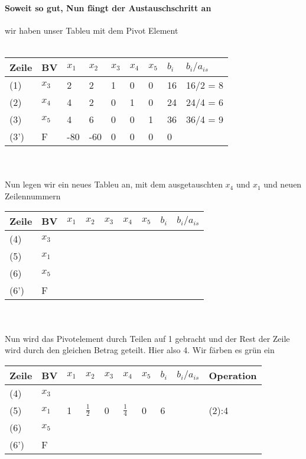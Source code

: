 \documentclass{article}
\begin{document}
\paragraph{Soweit so gut, Nun fängt der Austauschschritt an}
wir haben unser Tableu mit dem Pivot Element\\\\
\begin{tabular}{|l|l|l|l|l|l|l|l|l|}
	\hline
	Zeile & BV & $x_{1}$&$x_{2}$&$x_{3}$&$x_{4}$&$x_{5}$&$b_{i}$&$b_{i}/a_{is}$\\
	\hline
	(1)&$x_{3}$&2&2&1&0&0&16&16/2 = 8\\
	\hline
	(2)&$x_{4}$&\cellcolor{green}4&2&0&1&0&24&24/4 = 6\\
	\hline
	(3)&$x_{5}$&4&6&0&0&1&36&36/4 = 9\\
	\hline
	(3')&F&-80&-60&0&0&0&0&\\
	\hline
\end{tabular}\\\\
Nun legen wir ein neues Tableu an, mit dem ausgetauschten $x_{4}$ und $x_{1}$ und neuen Zeilennummern\\
\begin{tabular}{|l|l|l|l|l|l|l|l|l|}
	\hline
	Zeile & BV &\cellcolor{blue} $x_{1}$&$x_{2}$&$x_{3}$&$x_{4}$&$x_{5}$&$b_{i}$&$b_{i}/a_{is}$\\
	\hline
	(4)&$x_{3}$&&&&&&&\\
	\hline
	(5)&\cellcolor{blue}$x_{1}$&&&&&&&\\
	\hline
	(6)&$x_{5}$&&&&&&&\\
	\hline
	(6')&F&&&&&&&\\
	\hline
\end{tabular}\\\\
Nun wird das Pivotelement durch Teilen auf 1 gebracht und der Rest der Zeile wird durch den gleichen Betrag geteilt. Hier also 4. Wir färben es grün ein\\ 
\begin{tabular}{|l|l|l|l|l|l|l|l|l|l|}
	\hline
	Zeile & BV &$x_{1}$&$x_{2}$&$x_{3}$&$x_{4}$&$x_{5}$&$b_{i}$&$b_{i}/a_{is}$&Operation\\
	\hline
	(4)&$x_{3}$&&&&&&&&\\
	\hline
	(5)&$x_{1}$&\cellcolor{green}1&\cellcolor{green}$\frac{1}{2}$&\cellcolor{green}0&\cellcolor{green}$\frac{1}{4}$&\cellcolor{green}0&\cellcolor{green}6&&(2):4\\
	\hline
	(6)&$x_{5}$&&&&&&&&\\
	\hline
	(6')&F&&&&&&&&\\
	\hline
\end{tabular}\\\\
\end{document}
